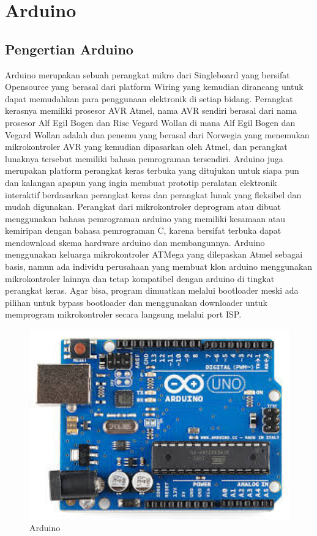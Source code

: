 \section{Arduino}
\subsection{Pengertian Arduino}
Arduino merupakan sebuah perangkat mikro dari Singleboard yang bersifat Opensource yang berasal dari platform Wiring yang kemudian dirancang untuk dapat memudahkan para penggunaan elektronik di setiap bidang. Perangkat kerasnya memiliki prosesor AVR Atmel, nama AVR sendiri berasal dari nama prosesor Alf Egil Bogen dan Risc Vegard Wollan di mana Alf Egil Bogen dan Vegard Wollan adalah dua penemu yang berasal dari Norwegia yang menemukan mikrokontroler AVR yang kemudian dipasarkan oleh Atmel, dan perangkat lunaknya tersebut memiliki bahasa pemrograman tersendiri. 
Arduino juga merupakan platform perangkat keras terbuka yang ditujukan untuk siapa pun dan kalangan apapun yang ingin membuat prototip peralatan elektronik interaktif berdasarkan perangkat keras dan perangkat lunak yang fleksibel dan mudah digunakan. Perangkat dari mikrokontroler deprogram atau dibuat menggunakan bahasa pemrograman arduino yang memiliki kesamaan atau kemiripan dengan bahasa pemrograman C, karena bersifat terbuka dapat mendownload skema hardware arduino dan membangunnya. 
Arduino menggunakan keluarga mikrokontroler ATMega yang dilepaskan Atmel sebagai basis, namun ada individu perusahaan yang membuat klon arduino menggunakan mikrokontroler lainnya dan tetap kompatibel dengan arduino di tingkat perangkat keras. Agar bisa, program dimuatkan melalui bootloader meski ada pilihan untuk bypass bootloader dan menggunakan downloader untuk memprogram mikrokontroler secara langsung melalui port ISP.

\begin{figure}[ht]
	\centerline{\includegraphics[width=1\textwidth]{figures/arduino.jpg}}
	\caption{Arduino}
	\label{sensor:Arduino}
	\end{figure}

